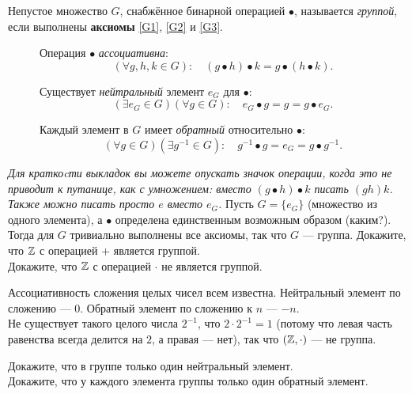 \documentclass[a4paper,12pt]{article}
\begin{document}
     Непустое множество $G$, снабжённое бинарной операцией $\bullet$, называется \emph{группой}, если выполнены \textbf{аксиомы} \ref{G1}, \ref{G2} и \ref{G3}.
    \begin{description}
        \item[] Операция $\bullet$ \emph{ассоциативна}:
        \begin{equation*}
            (\forall g, h, k \in G): \quad (g \bullet h) \bullet k = g \bullet (h \bullet k).
        \end{equation*}
        \item[] Существует \emph{нейтральный} элемент $e_G$ для $\bullet$:
        \begin{equation*}
            (\exists e_G \in G) (\forall g \in G): \quad e_G \bullet g = g = g \bullet e_G.
        \end{equation*}
        \item[] Каждый элемент в $G$ имеет \emph{обратный} относительно $\bullet$:
        \begin{equation*}
            (\forall g \in G) (\exists g^{-1} \in G): \quad g^{-1} \bullet g = e_G = g \bullet g^{-1}.
        \end{equation*}
    \end{description}
    \textit{Для краткоcти выкладок вы можете опускать значок операции, когда это не приводит к путанице, как с умножением: вместо $(g \bullet h) \bullet k$ писать $(gh)k$. Также можно писать просто $e$ вместо $e_G$.}
    \example Пусть $G = \{e_G\}$ (множество из одного элемента), а $\bullet$ определена единственным возможным образом (каким?). Тогда для $G$ тривиально выполнены все аксиомы, так что $G$ --- группа.
    \problem \sub Докажите, что $\mathbb{Z}$ с операцией $+$ является группой. \\
    \sub Докажите, что $\mathbb{Z}$ с операцией $\cdot$ не является группой.
\begin{solution}
    \sub Ассоциативность сложения целых чисел всем известна. Нейтральный элемент по сложению --- 0. Обратный элемент по сложению к $n$ --- $-n$. \\
    \sub Не существует такого целого числа $2^{-1}$, что $2 \cdot 2^{-1} = 1$ (потому что левая часть равенства всегда делится на $2$, а правая --- нет), так что $(\mathbb{Z}, \cdot)$ --- не группа.
\end{solution}
    \problem \sub Докажите, что в группе только один нейтральный элемент. \\
    \sub Докажите, что у каждого элемента группы только один обратный элемент.
\end{document}
